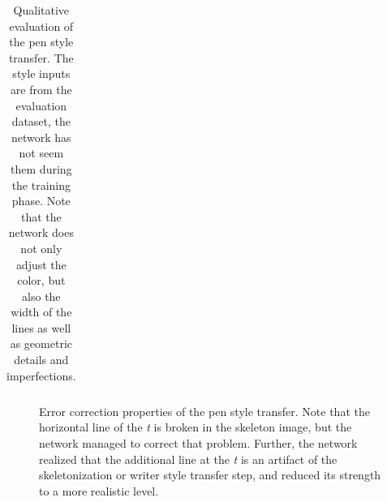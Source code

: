 \begin{table}
\begin{tabular}{ll}
  \bottomrule
  \end{tabular}
  \caption[Qualitative evaluation of the pen style transfer]{Qualitative evaluation of the pen style transfer. The style inputs are from the evaluation dataset, the network has not seem them during the training phase. Note that the network does not only adjust the color, but also the width of the lines as well as geometric details and imperfections.}
  \label{table:penStyleTransferEvaluation}
\end{table}

\begin{figure}
  \centering
  \hspace{0.1\textwidth}
  \caption[Error correction properties of the pen style transfer]{Error correction properties of the pen style transfer. Note that the horizontal line of the \emph{t} is broken in the skeleton image, but the network managed to correct that problem. Further, the network realized that the additional line at the \emph{t} is an artifact of the skeletonization or writer style transfer step, and reduced its strength to a more realistic level.}
  \label{fig:penStyleTransferErrorCorrection}
\end{figure}

